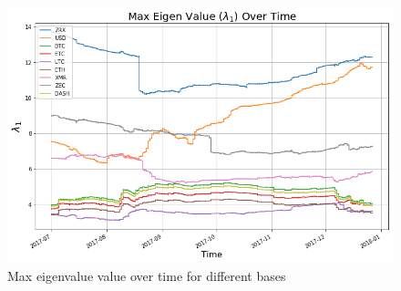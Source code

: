 \documentclass[a4paper]{article}
\begin{document}
\begin{figure}[H]
\centering
    \includegraphics[totalheight=8cm]{lambda1_time.png}
    \caption{Max eigenvalue value over time for different bases}
    \label{fig:lambda1_time}
\end{figure}
\end{document}
